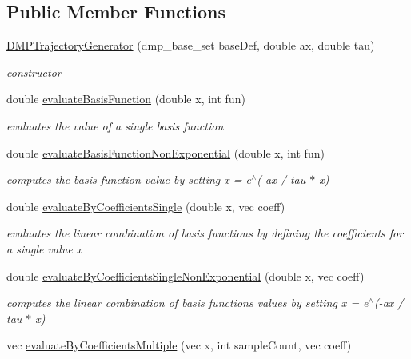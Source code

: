 \subsection*{\-Public \-Member \-Functions}
\begin{DoxyCompactItemize}
\item 
\hyperlink{classDMPTrajectoryGenerator_afb19649fe4c57dae73a44246517f0d93}{\-D\-M\-P\-Trajectory\-Generator} (dmp\-\_\-base\-\_\-set base\-Def, double ax, double tau)
\begin{DoxyCompactList}\small\item\em constructor \end{DoxyCompactList}\item 
double \hyperlink{classDMPTrajectoryGenerator_a992493451729424e9c6420f112614b25}{evaluate\-Basis\-Function} (double x, int fun)
\begin{DoxyCompactList}\small\item\em evaluates the value of a single basis function \end{DoxyCompactList}\item 
double \hyperlink{classDMPTrajectoryGenerator_a7ea77e621ceaf48757bc55fc9b3e4eaf}{evaluate\-Basis\-Function\-Non\-Exponential} (double x, int fun)
\begin{DoxyCompactList}\small\item\em computes the basis function value by setting x = e$^\wedge$(-\/ax / tau $\ast$ x) \end{DoxyCompactList}\item 
double \hyperlink{classDMPTrajectoryGenerator_ad5937ddc13203ab6b11e5366a0c9b57d}{evaluate\-By\-Coefficients\-Single} (double x, vec coeff)
\begin{DoxyCompactList}\small\item\em evaluates the linear combination of basis functions by defining the coefficients for a single value x \end{DoxyCompactList}\item 
double \hyperlink{classDMPTrajectoryGenerator_aa5e6de04ce60232ca1f80c58f8014fe2}{evaluate\-By\-Coefficients\-Single\-Non\-Exponential} (double x, vec coeff)
\begin{DoxyCompactList}\small\item\em computes the linear combination of basis functions values by setting x = e$^\wedge$(-\/ax / tau $\ast$ x) \end{DoxyCompactList}\item 
vec \hyperlink{classDMPTrajectoryGenerator_abd9752e2ff28ad3f2e92b333d3d59d9b}{evaluate\-By\-Coefficients\-Multiple} (vec x, int sample\-Count, vec coeff)

\end{DoxyCompactItemize}

